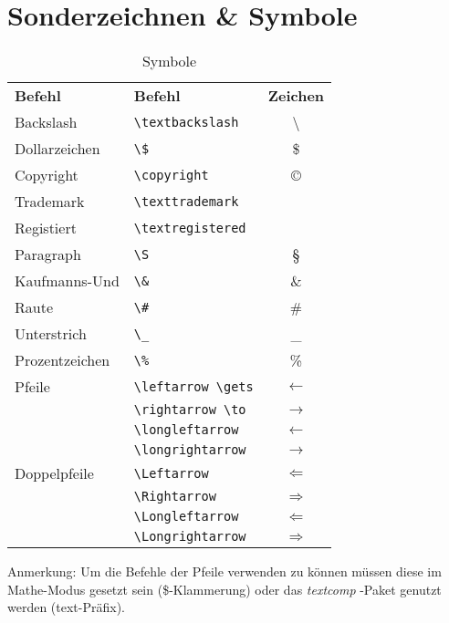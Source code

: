 \section{Sonderzeichnen \& Symbole}
\setlength{\tabcolsep}{1cm}
\begin{table}[H]
\begin{tabular}{l l c}
\textbf{Befehl}				&\textbf{Befehl}			&\textbf{Zeichen}\\
Backslash					&\verb=\textbackslash=	&\textbackslash\\
Dollarzeichen				&\verb=\$=				&\$\\
Copyright					&\verb=\copyright=		&\copyright\\
Trademark					&\verb=\texttrademark=	&\texttrademark\\
Registiert					&\verb=\textregistered=	&\textregistered\\
Paragraph					&\verb=\S=				&\S\\
Kaufmanns-Und				&\verb=\&=			&\&\\
Raute					&\verb=\#=			&\#\\

Unterstrich				&\verb=\_=				&\_\\
Prozentzeichen				&\verb=\%=			&\%\\
Pfeile					&\verb=\leftarrow \gets=	&$\leftarrow$\\
						&\verb=\rightarrow \to=	&$\to$\\
						&\verb=\longleftarrow=	&$\longleftarrow$\\
						&\verb=\longrightarrow=	&$\longrightarrow$\\
Doppelpfeile				&\verb=\Leftarrow=		&$\Leftarrow$\\
						&\verb=\Rightarrow=		&$\Rightarrow$\\
						&\verb=\Longleftarrow=	&$\Longleftarrow$\\
						&\verb=\Longrightarrow=	&$\Longrightarrow$\\


\end{tabular}
\caption{Symbole}
\end{table}
Anmerkung: Um die Befehle der Pfeile verwenden zu können müssen diese im Mathe-Modus gesetzt sein (\$-Klammerung) oder das \textsl{textcomp} -Paket genutzt werden (text-Präfix).